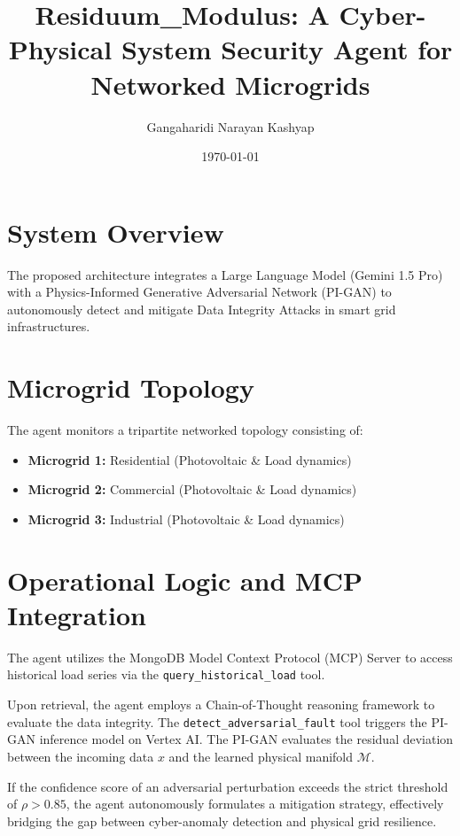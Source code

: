 \documentclass[11pt,a4paper]{article}
\title{\textbf{Residuum\_Modulus: A Cyber-Physical System Security Agent for Networked Microgrids}}
\author{Gangaharidi Narayan Kashyap}
\date{\today}
\begin{document}
\maketitle

\section{System Overview}
The proposed architecture integrates a Large Language Model (Gemini 1.5 Pro) with a Physics-Informed Generative Adversarial Network (PI-GAN) to autonomously detect and mitigate Data Integrity Attacks in smart grid infrastructures. 

\section{Microgrid Topology}
The agent monitors a tripartite networked topology consisting of:
\begin{itemize}
    \item \textbf{Microgrid 1:} Residential (Photovoltaic \& Load dynamics)
    \item \textbf{Microgrid 2:} Commercial (Photovoltaic \& Load dynamics)
    \item \textbf{Microgrid 3:} Industrial (Photovoltaic \& Load dynamics)
\end{itemize}

\section{Operational Logic and MCP Integration}
The agent utilizes the MongoDB Model Context Protocol (MCP) Server to access historical load series via the \texttt{query\_historical\_load} tool. 

Upon retrieval, the agent employs a Chain-of-Thought reasoning framework to evaluate the data integrity. The \texttt{detect\_adversarial\_fault} tool triggers the PI-GAN inference model on Vertex AI. The PI-GAN evaluates the residual deviation between the incoming data $x$ and the learned physical manifold $\mathcal{M}$. 

If the confidence score of an adversarial perturbation exceeds the strict threshold of $\rho > 0.85$, the agent autonomously formulates a mitigation strategy, effectively bridging the gap between cyber-anomaly detection and physical grid resilience.
\end{document}
